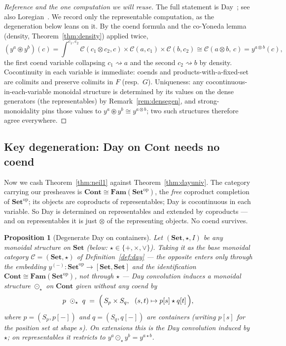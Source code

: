\documentclass[11pt]{article}
\theoremstyle{plain}
\newtheorem{proposition}[theorem]{Proposition}
\theoremstyle{definition}
\newcommand{\Set}{\mathbf{Set}}
\newcommand{\Cont}{\mathbf{Cont}}
\newcommand{\Fam}{\mathbf{Fam}}
\newcommand{\op}{^{\mathrm{op}}}
\newcommand{\Day}{\circledast}
\newcommand{\Dayc}{\odot}
\newcommand{\iso}{\cong}
\begin{document}
\begin{proof}[Reference and the one computation we will reuse]
The full statement is Day~\cite{Day1970}; see also
Loregian~\cite[Ch.~3]{Loregian}. We record only the representable computation, as
the degeneration below leans on it. By the coend formula and the co-Yoneda lemma
(density, Theorem~\ref{thm:density}) applied twice,
\[
  (y^{a}\Day y^{b})(c)
  = \int^{c_{1},c_{2}} \mathcal{C}(c_{1}\otimes c_{2},c)\times
      \mathcal{C}(a,c_{1})\times\mathcal{C}(b,c_{2})
  \iso \mathcal{C}(a\otimes b,\,c) = y^{a\otimes b}(c),
\]
the first coend variable collapsing $c_{1}\rightsquigarrow a$ and the second
$c_{2}\rightsquigarrow b$ by density. Cocontinuity in each variable is immediate:
coends and products-with-a-fixed-set are colimits and preserve colimits in $F$
(resp.\ $G$). Uniqueness: any cocontinuous-in-each-variable monoidal structure is
determined by its values on the dense generators (the representables) by
Remark~\ref{rem:densegen}, and strong-monoidality pins those values to
$y^{a}\Day y^{b}\iso y^{a\otimes b}$; two such structures therefore agree
everywhere. \end{proof}

\subsection{Key degeneration: Day on $\Cont$ needs no coend}
\label{sub:degen}

Now we cash Theorem~\ref{thm:neil1} against Theorem~\ref{thm:dayuniv}. The
category carrying our presheaves is $\Cont\iso\Fam(\Set\op)$, the \emph{free}
coproduct completion of $\Set\op$; its objects are coproducts of representables;
Day is cocontinuous in each variable. So Day is determined on representables and
extended by coproducts --- and on representables it is just $\otimes$ of the
representing objects. No coend survives.

\begin{proposition}[Degenerate Day on containers]
\label{prop:degen}
Let $(\Set,\star,I)$ be any monoidal structure on $\Set$ (below: $\star\in\{+,
\times,\vee\}$). Taking it as the base monoidal category $\mathcal C=(\Set,\star)$
of Definition~\ref{def:day} --- the opposite enters only through the
\emph{embedding} $y^{(-)}\colon\Set\op\to[\Set,\Set]$ and the identification
$\Cont\iso\Fam(\Set\op)$, not through $\star$ --- Day convolution induces a
monoidal structure $\Dayc_{\star}$ on $\Cont$ given \emph{without any coend} by
\[
  p\ \Dayc_{\star}\ q \;=\;\Bigl(\,S_{p}\times S_{q},\ \ (s,t)\mapsto p[s]\star q[t]\,\Bigr),
\]
where $p=(S_{p},p[-])$ and $q=(S_{q},q[-])$ are containers (writing $p[s]$ for the
position set at shape $s$). On extensions this is the Day convolution induced by
$\star$; on representables it restricts to $y^{a}\Dayc_{\star}y^{b}=y^{a\star b}$.
\end{proposition}
\end{document}
